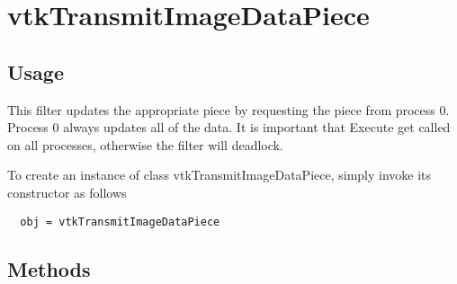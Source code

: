 \section{vtkTransmitImageDataPiece}

\subsection{Usage}

 This filter updates the appropriate piece by requesting the piece from 
 process 0.  Process 0 always updates all of the data.  It is important that 
 Execute get called on all processes, otherwise the filter will deadlock.

To create an instance of class vtkTransmitImageDataPiece, simply
invoke its constructor as follows
\begin{verbatim}
  obj = vtkTransmitImageDataPiece
\end{verbatim}
\subsection{Methods}

